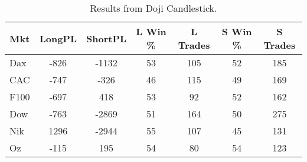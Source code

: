 \begin{table}[ht]
\centering
\caption[Doji Candlestick System]{Results from Doji Candlestick.} 
\label{tab:doji_aroon_results}
\begin{tabular}{lcccccc}
  \toprule Mkt & LongPL & ShortPL & L Win \% & L Trades & S Win \% & S Trades \\ 
  \midrule Dax & -826 & -1132 & 53 & 105 & 52 & 185 \\ 
  CAC & -747 & -326 & 46 & 115 & 49 & 169 \\ 
  F100 & -697 & 418 & 53 & 92 & 52 & 162 \\ 
  Dow & -763 & -2869 & 51 & 164 & 50 & 275 \\ 
  Nik & 1296 & -2944 & 55 & 107 & 45 & 131 \\ 
  Oz & -115 & 195 & 54 & 80 & 54 & 123 \\ 
   \bottomrule \end{tabular}
\end{table}
